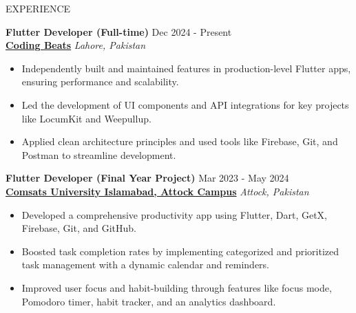 \documentclass{resume} %
\begin{document}
\begin{rSection}{EXPERIENCE}

\textbf{Flutter Developer (Full-time)} \hfill Dec 2024 - Present\\
\textbf{\href{https://www.linkedin.com/company/codingbeats}{Coding Beats}} \hfill \textit{Lahore, Pakistan}
 \begin{itemize}
    \itemsep -5pt {}
\item Independently built and maintained features in production-level Flutter apps, ensuring performance and scalability.
\item Led the development of UI components and API integrations for key projects like LocumKit and Weepullup.
\item Applied clean architecture principles and used tools like Firebase, Git, and Postman to streamline development.
 \end{itemize}

\vspace{0.8em}

 \textbf{Flutter Developer (Final Year Project)} \hfill Mar 2023 - May 2024\\
\textbf{\href{https://www.linkedin.com/company/comsats-university-islamabad-attock-campus/}{Comsats University Islamabad, Attock Campus}} \hfill \textit{Attock, Pakistan}
 \begin{itemize}
    \itemsep -5pt {}
\item Developed a comprehensive productivity app using Flutter, Dart, GetX, Firebase, Git, and GitHub.
\item Boosted task completion rates by implementing categorized and prioritized task management with a dynamic calendar and reminders.
\item Improved user focus and habit-building through features like focus mode, Pomodoro timer, habit tracker, and an analytics dashboard.
 \end{itemize}



\end{rSection}
\end{document}
